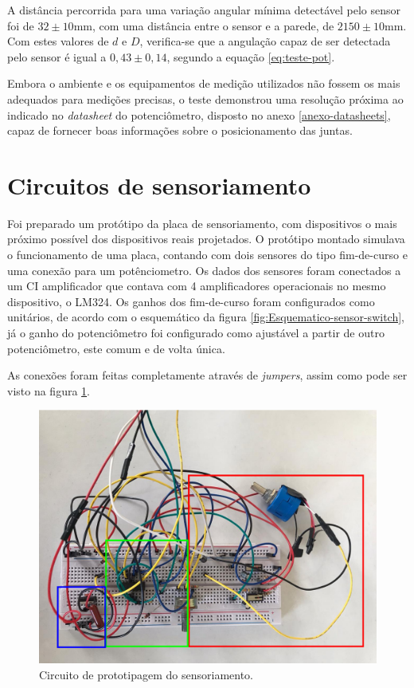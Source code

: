 A distância percorrida para uma variação angular mínima detectável pelo sensor 
foi de $32\pm 10$mm, com uma distância entre o sensor e a parede, de $2150\pm 10$mm. 
Com estes valores de $d$ e $D$, verifica-se que a angulação 
capaz de ser detectada pelo sensor é igual a $0,\!43\pm 0,\!14$\textdegree, segundo a 
equação \ref{eq:teste-pot}.

Embora o ambiente e os equipamentos de medição utilizados não fossem os mais adequados
para medições precisas, o teste demonstrou uma resolução próxima 
ao indicado no \textit{datasheet} do potenciômetro, disposto no anexo \ref{anexo-datasheets}, 
capaz de fornecer boas informações sobre o posicionamento das juntas.

\section{Circuitos de sensoriamento}

Foi preparado um protótipo da placa de sensoriamento, com dispositivos o mais próximo possível 
dos dispositivos reais projetados. O protótipo montado simulava o funcionamento de uma 
placa, contando com dois sensores do tipo fim-de-curso e uma conexão para um potênciometro.
Os dados dos sensores foram conectados a um CI amplificador que contava com 4 amplificadores
operacionais no mesmo dispositivo, o LM324. Os ganhos dos fim-de-curso foram configurados como 
unitários, de acordo com o esquemático da figura \ref{fig:Esquematico-sensor-switch}, já o ganho
do potenciômetro foi configurado como ajustável a partir de outro potenciômetro, este comum e de
volta única.

As conexões foram feitas completamente através de \textit{jumpers}, assim como pode ser visto na
figura \ref{fig:proto-sensor}.

\begin{figure}[h]
    \caption{Circuito de prototipagem do sensoriamento.}

    \begin{centering}
        \includegraphics[width=0.75\columnwidth]{images/resultados/proto-sensor.jpeg} 
    \par\end{centering}

    \label{fig:proto-sensor}
\end{figure}


